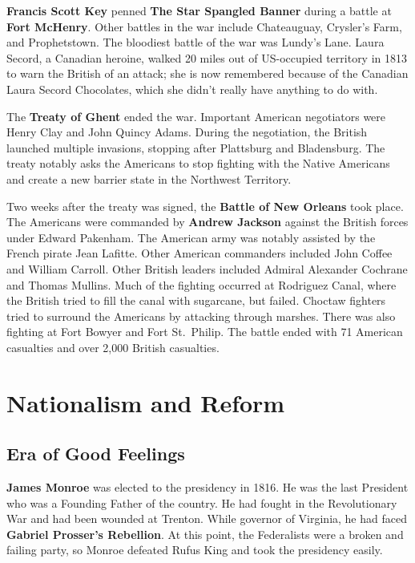 \textbf{Francis Scott Key} penned \textbf{The Star Spangled Banner} during a battle at \textbf{Fort McHenry}.
Other battles in the war include Chateauguay, Crysler's Farm, and Prophetstown.
The bloodiest battle of the war was Lundy's Lane.
Laura Secord, a Canadian heroine,
walked 20 miles out of US-occupied territory in 1813 to warn the British of an attack;
she is now remembered because of the Canadian Laura Secord Chocolates,
which she didn't really have anything to do with.

The \textbf{Treaty of Ghent} ended the war.
Important American negotiators were Henry Clay and John Quincy Adams.
During the negotiation, the British launched multiple invasions, stopping after Plattsburg and Bladensburg.
The treaty notably asks the Americans to stop fighting with the Native Americans
and create a new barrier state in the Northwest Territory.

Two weeks after the treaty was signed, the \textbf{Battle of New Orleans} took place.
The Americans were commanded by \textbf{Andrew Jackson} against the British forces under Edward Pakenham.
The American army was notably assisted by the French pirate Jean Lafitte.
Other American commanders included John Coffee and William Carroll.
Other British leaders included Admiral Alexander Cochrane and Thomas Mullins.
Much of the fighting occurred at Rodriguez Canal, where the British tried to fill the canal with sugarcane, but failed.
Choctaw fighters tried to surround the Americans by attacking through marshes.
There was also fighting at Fort Bowyer and Fort St.\ Philip.
The battle ended with 71 American casualties and over 2,000 British casualties.

\section{Nationalism and Reform}

\subsection*{Era of Good Feelings}

\textbf{James Monroe} was elected to the presidency in 1816.
He was the last President who was a Founding Father of the country.
He had fought in the Revolutionary War and had been wounded at Trenton.
While governor of Virginia, he had faced \textbf{Gabriel Prosser's Rebellion}.
At this point, the Federalists were a broken and failing party,
so Monroe defeated Rufus King and took the presidency easily.

